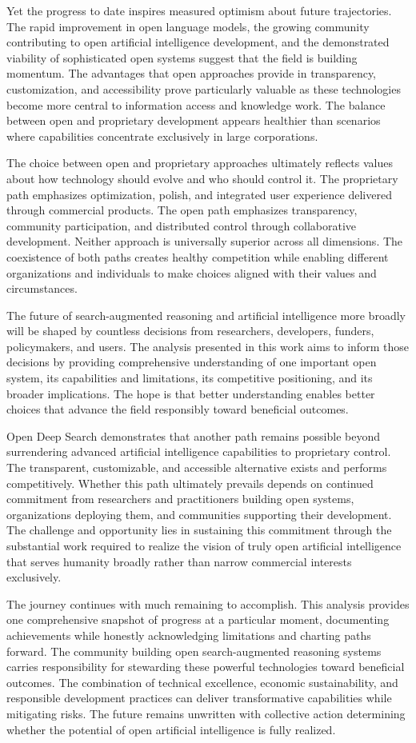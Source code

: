 Yet the progress to date inspires measured optimism about future trajectories. The rapid improvement in open language models, the growing community contributing to open artificial intelligence development, and the demonstrated viability of sophisticated open systems suggest that the field is building momentum. The advantages that open approaches provide in transparency, customization, and accessibility prove particularly valuable as these technologies become more central to information access and knowledge work. The balance between open and proprietary development appears healthier than scenarios where capabilities concentrate exclusively in large corporations.

The choice between open and proprietary approaches ultimately reflects values about how technology should evolve and who should control it. The proprietary path emphasizes optimization, polish, and integrated user experience delivered through commercial products. The open path emphasizes transparency, community participation, and distributed control through collaborative development. Neither approach is universally superior across all dimensions. The coexistence of both paths creates healthy competition while enabling different organizations and individuals to make choices aligned with their values and circumstances.

The future of search-augmented reasoning and artificial intelligence more broadly will be shaped by countless decisions from researchers, developers, funders, policymakers, and users. The analysis presented in this work aims to inform those decisions by providing comprehensive understanding of one important open system, its capabilities and limitations, its competitive positioning, and its broader implications. The hope is that better understanding enables better choices that advance the field responsibly toward beneficial outcomes.

Open Deep Search demonstrates that another path remains possible beyond surrendering advanced artificial intelligence capabilities to proprietary control. The transparent, customizable, and accessible alternative exists and performs competitively. Whether this path ultimately prevails depends on continued commitment from researchers and practitioners building open systems, organizations deploying them, and communities supporting their development. The challenge and opportunity lies in sustaining this commitment through the substantial work required to realize the vision of truly open artificial intelligence that serves humanity broadly rather than narrow commercial interests exclusively.

The journey continues with much remaining to accomplish. This analysis provides one comprehensive snapshot of progress at a particular moment, documenting achievements while honestly acknowledging limitations and charting paths forward. The community building open search-augmented reasoning systems carries responsibility for stewarding these powerful technologies toward beneficial outcomes. The combination of technical excellence, economic sustainability, and responsible development practices can deliver transformative capabilities while mitigating risks. The future remains unwritten with collective action determining whether the potential of open artificial intelligence is fully realized.
